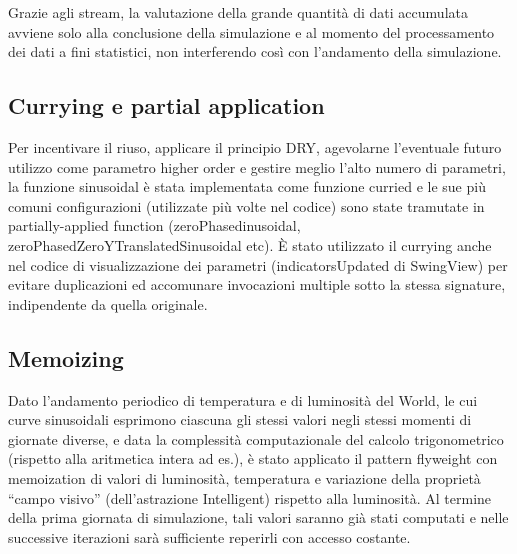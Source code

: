 Grazie agli stream, la valutazione della grande quantità di dati accumulata avviene solo alla conclusione della simulazione e al momento del processamento dei dati a fini statistici, non interferendo così con l’andamento della simulazione.

\subsection{Currying e partial application}
Per incentivare il riuso, applicare il principio DRY, agevolarne l’eventuale futuro utilizzo come parametro higher order e gestire meglio l’alto numero di parametri, la funzione sinusoidal è stata implementata come funzione curried e le sue più comuni configurazioni (utilizzate più volte nel codice) sono state tramutate in partially-applied function (zeroPhasedinusoidal, zeroPhasedZeroYTranslatedSinusoidal etc). È stato utilizzato il currying anche nel codice di visualizzazione dei parametri (indicatorsUpdated di SwingView) per evitare duplicazioni ed accomunare invocazioni multiple sotto la stessa signature, indipendente da quella originale.

\subsection{Memoizing}
Dato l’andamento periodico di temperatura e di luminosità del World, le cui curve sinusoidali esprimono ciascuna gli stessi valori negli stessi momenti di giornate diverse, e data la complessità computazionale del calcolo trigonometrico (rispetto alla aritmetica intera ad es.), è stato applicato il pattern flyweight con memoization di valori di luminosità, temperatura e variazione della proprietà “campo visivo” (dell’astrazione Intelligent) rispetto alla luminosità. Al termine della prima giornata di simulazione, tali valori saranno già stati computati e nelle successive iterazioni sarà sufficiente reperirli con accesso costante.


